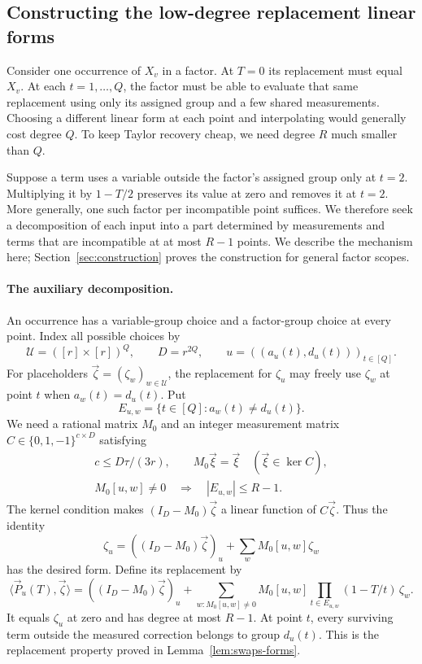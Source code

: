 \subsection{Constructing the low-degree replacement linear forms}
\label{subsec:preview-auxiliary}
Consider one occurrence of $X_v$ in a factor. At $T=0$ its
replacement must equal $X_v$. At each $t=1,\ldots,Q$, the factor
must be able to evaluate that same replacement using only its
assigned group and a few shared measurements. Choosing a different
linear form at each point and interpolating would generally cost
degree $Q$. To keep Taylor recovery cheap, we need degree $R$
much smaller than $Q$.

Suppose a term uses a variable outside the factor's assigned group
only at $t=2$. Multiplying it by $1-T/2$ preserves its value at zero
and removes it at $t=2$. More generally, one such factor per
incompatible point suffices. We therefore seek a decomposition of
each input into a part determined by measurements and terms that
are incompatible at at most $R-1$ points. We describe the mechanism
here; Section~\ref{sec:construction} proves the construction for
general factor scopes.

\paragraph{The auxiliary decomposition.}
An occurrence has a variable-group choice and a factor-group choice
at every point. Index all possible choices by
\[
 \mathcal U=([r]\times[r])^Q,\qquad D=r^{2Q},\qquad
 u=((a_u(t),d_u(t)))_{t\in[Q]}.
\]
For placeholders $\vec\zeta=(\zeta_w)_{w\in\mathcal U}$, the
replacement for $\zeta_u$ may freely use $\zeta_w$ at point $t$
when $a_w(t)=d_u(t)$. Put
\[
 E_{u,w}=\{t\in[Q]:a_w(t)\ne d_u(t)\}.
\]
We need a rational matrix $M_0$ and an integer measurement matrix
$C\in\{0,1,-1\}^{c\times D}$ satisfying
\begin{equation}\label{eq:outline-matrix-conditions}
 \begin{gathered}
 c\le D\tau/(3r),\qquad
 M_0\vec\xi=\vec\xi\quad(\vec\xi\in\ker C),\\
 M_0[u,w]\ne0\quad\Longrightarrow\quad |E_{u,w}|\le R-1.
 \end{gathered}
\end{equation}
The kernel condition makes $(I_D-M_0)\vec\zeta$ a linear function
of $C\vec\zeta$. Thus the identity
\[
 \zeta_u=((I_D-M_0)\vec\zeta)_u+
                   \sum_w M_0[u,w]\zeta_w
\]
has the desired form. Define its replacement by
\begin{equation}\label{eq:outline-auxiliary-row}
 \langle\vec P_u(T),\vec\zeta\rangle
 =((I_D-M_0)\vec\zeta)_u+
   \sum_{w:M_0[u,w]\ne0}M_0[u,w]
       \prod_{t\in E_{u,w}}(1-T/t)\,\zeta_w.
\end{equation}
It equals $\zeta_u$ at zero and has degree at most $R-1$.
At point $t$, every surviving term outside the measured correction
belongs to group $d_u(t)$. This is the replacement property proved
in Lemma~\ref{lem:swaps-forms}.

